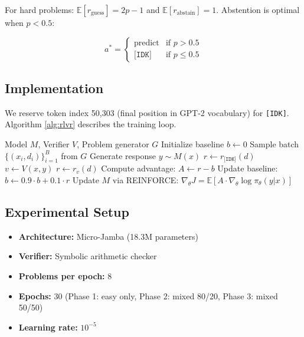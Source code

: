 \documentclass{article}
\begin{document}
For hard problems: $\mathbb{E}[r_{\text{guess}}] = 2p - 1$ and $\mathbb{E}[r_{\text{abstain}}] = 1$. Abstention is optimal when $p < 0.5$:

\begin{equation}
    a^* = \begin{cases}
        \text{predict} & \text{if } p > 0.5 \\
        \texttt{[IDK]} & \text{if } p \leq 0.5
    \end{cases}
    \label{eq:decision}
\end{equation}

\subsection{Implementation}
We reserve token index 50,303 (final position in GPT-2 vocabulary) for \texttt{[IDK]}. Algorithm \ref{alg:rlvr} describes the training loop.

\begin{algorithm}
\caption{RLVR Training with Ternary Rewards}
\label{alg:rlvr}
\begin{algorithmic}[1]
\Require Model $M$, Verifier $V$, Problem generator $G$
\State Initialize baseline $b \gets 0$
    \State Sample batch $\{(x_i, d_i)\}_{i=1}^B$ from $G$
        \State Generate response $y \sim M(x)$
            \State $r \gets r_{\texttt{[IDK]}}(d)$ 
        \Else
            \State $v \gets V(x, y)$ 
            \State $r \gets r_v(d)$
        \EndIf
        \State Compute advantage: $A \gets r - b$
        \State Update baseline: $b \gets 0.9 \cdot b + 0.1 \cdot r$
    \EndFor
    \State Update $M$ via REINFORCE: $\nabla_\theta J = \mathbb{E}[A \cdot \nabla_\theta \log \pi_\theta(y|x)]$
\EndFor
\end{algorithmic}
\end{algorithm}

\subsection{Experimental Setup}
\begin{itemize}
    \item \textbf{Architecture:} Micro-Jamba (18.3M parameters)
    \item \textbf{Verifier:} Symbolic arithmetic checker
    \item \textbf{Problems per epoch:} 8
    \item \textbf{Epochs:} 30 (Phase 1: easy only, Phase 2: mixed 80/20, Phase 3: mixed 50/50)
    \item \textbf{Learning rate:} $10^{-5}$
\end{itemize}
\end{document}
